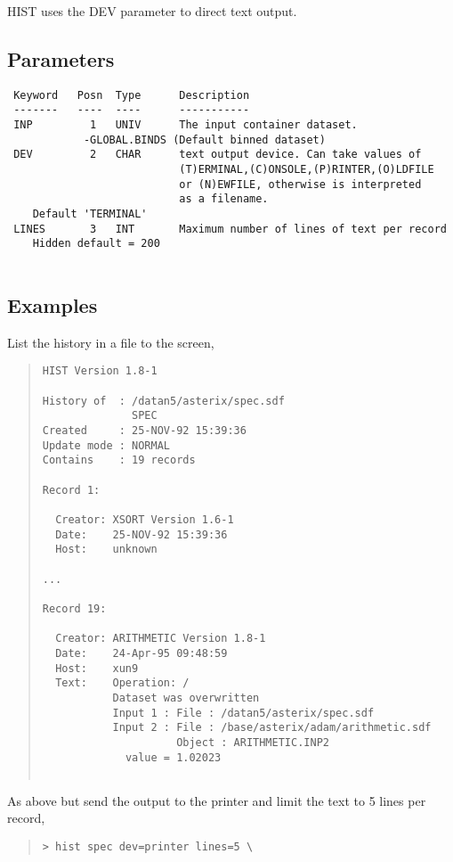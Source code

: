 \documentclass{book}
\renewcommand{\_}{{\tt\char'137}}     %
\begin{document}
HIST uses the DEV parameter to direct text output.
 
\subsection{Parameters}
\begin{verbatim}
 Keyword   Posn  Type      Description
 -------   ----  ----      -----------
 INP         1   UNIV      The input container dataset.
            -GLOBAL.BINDS (Default binned dataset)
 DEV         2   CHAR      text output device. Can take values of
                           (T)ERMINAL,(C)ONSOLE,(P)RINTER,(O)LDFILE
                           or (N)EWFILE, otherwise is interpreted
                           as a filename.
    Default 'TERMINAL'
 LINES       3   INT       Maximum number of lines of text per record
    Hidden default = 200
 
\end{verbatim}\subsection{Examples}
List the history in a file to the screen,
\begin{quote}\begin{verbatim}
HIST Version 1.8-1
 
History of  : /datan5/asterix/spec.sdf
              SPEC
Created     : 25-NOV-92 15:39:36
Update mode : NORMAL
Contains    : 19 records
 
Record 1:
 
  Creator: XSORT Version 1.6-1
  Date:    25-NOV-92 15:39:36
  Host:    unknown
 
...
 
Record 19:
 
  Creator: ARITHMETIC Version 1.8-1
  Date:    24-Apr-95 09:48:59
  Host:    xun9
  Text:    Operation: /
           Dataset was overwritten
           Input 1 : File : /datan5/asterix/spec.sdf
           Input 2 : File : /base/asterix/adam/arithmetic.sdf
                     Object : ARITHMETIC.INP2
             value = 1.02023
 
\end{verbatim}\end{quote}
As above but send the output to the printer and limit the text to 5 lines
per record,
\begin{quote}\begin{verbatim}
> hist spec dev=printer lines=5 \
\end{verbatim}\end{quote}
\end{document}
